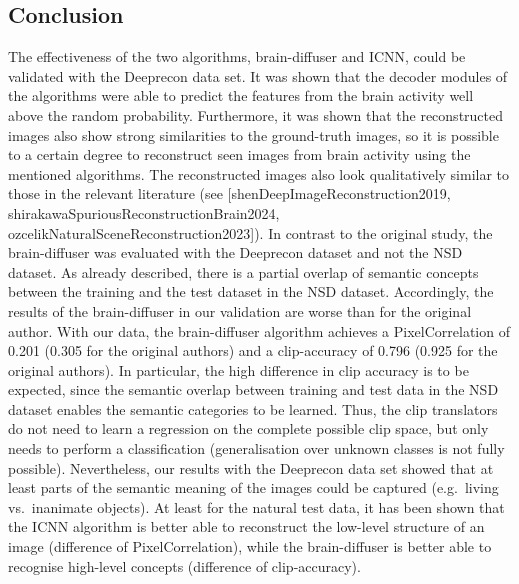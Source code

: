 \subsection{Conclusion}
The effectiveness of the two algorithms, brain-diffuser and ICNN, could be validated with the Deeprecon data set. It was shown that the decoder modules of the algorithms were able to predict the features from the brain activity well above the random probability. Furthermore, it was shown that the reconstructed images also show strong similarities to the ground-truth images, so it is possible to a certain degree to reconstruct seen images from brain activity using the mentioned algorithms. The reconstructed images also look qualitatively similar to those in the relevant literature (see [shenDeepImageReconstruction2019, shirakawaSpuriousReconstructionBrain2024, ozcelikNaturalSceneReconstruction2023]).
In contrast to the original study, the brain-diffuser was evaluated with the Deeprecon dataset and not the NSD dataset. As already described, there is a partial overlap of semantic concepts between the training and the test dataset in the NSD dataset. Accordingly, the results of the brain-diffuser in our validation are worse than for the original author\cite{ozcelikNaturalSceneReconstruction2023}. With our data, the brain-diffuser algorithm achieves a PixelCorrelation of 0.201 (0.305 for the original authors) and a clip-accuracy of 0.796 (0.925 for the original authors). In particular, the high difference in clip accuracy is to be expected, since the semantic overlap between training and test data in the NSD dataset enables the semantic categories to be learned. Thus, the clip translators do not need to learn a regression on the complete possible clip space, but only needs to perform a classification (generalisation over unknown classes is not fully possible). 
Nevertheless, our results with the Deeprecon data set showed that at least parts of the semantic meaning of the images could be captured (e.g.\ living vs.\ inanimate objects). At least for the natural test data, it has been shown that the ICNN algorithm is better able to reconstruct the low-level structure of an image (difference of PixelCorrelation), while the brain-diffuser is better able to recognise high-level concepts (difference of clip-accuracy). 
